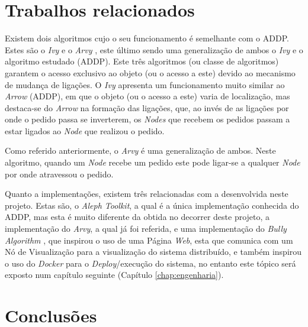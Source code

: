 \section{Trabalhos relacionados}
\label{motivacao:sec:trabalhos_relacionados}

Existem dois algoritmos cujo o seu funcionamento é semelhante com o \acs*{ADDP}.
Estes são o \emph{Ivy} \cite{Ivy} e o \emph{Arvy} \cite{Arvy}, este último sendo uma generalização de ambos o \emph{Ivy} e o algoritmo estudado (\acs{ADDP}).
Este três algoritmos (ou classe de algoritmos) garantem o acesso exclusivo ao objeto (ou o acesso a este) devido ao mecanismo de mudança de ligações.
O \emph{Ivy} apresenta um funcionamento muito similar ao \emph{Arrow} (\acs*{ADDP}),
em que o objeto (ou o acesso a este) varia de localização,
mas destaca-se do \emph{Arrow} na formação das ligações, que,
ao invés de as ligações por onde o pedido passa se inverterem,
os \emph{Nodes} que recebem os pedidos passam a estar ligados ao \emph{Node} que realizou o pedido.

Como referido anteriormente, o \emph{Arvy} é uma generalização de ambos.
Neste algoritmo, quando um \emph{Node} recebe um pedido este pode ligar-se a qualquer \emph{Node} por onde atravessou o pedido.


Quanto a implementações, existem três relacionadas com a desenvolvida neste projeto. 
Estas são, o \emph{Aleph Toolkit}\cite{aleph}, a qual é a única implementação conhecida do \acs*{ADDP}, mas esta é muito diferente da obtida no decorrer deste projeto, 
a implementação do \emph{Arvy}, a qual já foi referida, 
e uma implementação do \emph{Bully Algorithm} \cite{bully}, que inspirou o uso de uma Página \emph{Web}, esta que comunica com um Nó de Visualização para a visualização do sistema distribuído, e 
também inspirou o uso do \emph{Docker} para o \emph{Deploy}/execução do sistema, no entanto este tópico será exposto num capítulo seguinte (Capítulo \ref{chap:engenharia}).



\section{Conclusões}
\label{motivacao:sec:conclusao}

